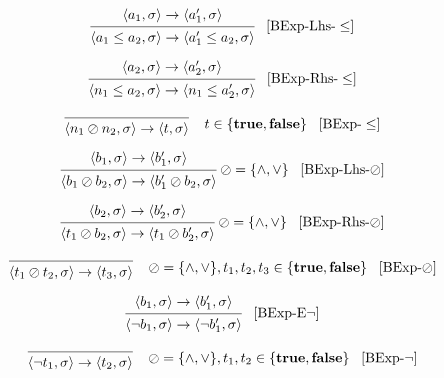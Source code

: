 \[
\begin{prooftree}
\hypo{
	\langle a_1, \sigma \rangle \rightarrow
	\langle a_1^\prime, \sigma \rangle 
} 
\infer1{
	\langle a_1 \leq a_2, \sigma \rangle \rightarrow  
	\langle a_1^\prime \leq a_2, \sigma \rangle
}
\end{prooftree} \; \; \; [\text{BExp-Lhs-}\leq]
\]

\[
\begin{prooftree}
\hypo{
	\langle a_2, \sigma \rangle \rightarrow
	\langle a_2^\prime, \sigma \rangle 
} 
\infer1{
	\langle n_1 \leq a_2, \sigma \rangle \rightarrow  
	\langle n_1 \leq a_2^\prime, \sigma \rangle
}
\end{prooftree} \; \; \; [\text{BExp-Rhs-}\leq]
\]

\[
\begin{prooftree}
\infer0{
	\langle n_1 \oslash n_2, \sigma \rangle \rightarrow  
	\langle t, \sigma \rangle
}
\end{prooftree} \; \; \; \; t \in \{ \textbf{true}, \textbf{false} \} \; \; \; [\text{BExp-}\leq]
\]

\[
\begin{prooftree}
\hypo{
	\langle b_1, \sigma \rangle \rightarrow
	\langle b_1^\prime, \sigma \rangle 
} 
\infer1{
	\langle b_1 \oslash b_2, \sigma \rangle \rightarrow  
	\langle b_1^\prime \oslash b_2, \sigma \rangle
}
\end{prooftree} \; \oslash = \{\land,\lor\} \; \; \; [\text{BExp-Lhs-}\oslash]
\]

\[
\begin{prooftree}
\hypo{
	\langle b_2, \sigma \rangle \rightarrow
	\langle b_2^\prime, \sigma \rangle 
} 
\infer1{
	\langle t_1 \oslash b_2, \sigma \rangle \rightarrow  
	\langle t_1 \oslash b_2^\prime, \sigma \rangle
}
\end{prooftree} \; \oslash = \{\land,\lor\} \; \; \; [\text{BExp-Rhs-}\oslash]
\]

\[
\begin{prooftree}
\infer0{
	\langle t_1 \oslash t_2, \sigma \rangle \rightarrow  
	\langle t_3,  \sigma \rangle
}
\end{prooftree} \; \; \; \; \oslash = \{\land,\lor\}, t_1, t_2, t_3 \in \{ \textbf{true}, \textbf{false} \}  \; \; \; [\text{BExp-}\oslash]
\]

\[
\begin{prooftree}
\hypo{
	\langle b_1, \sigma \rangle \rightarrow  
	\langle b_1^\prime,  \sigma \rangle
}
\infer1{
	\langle \neg b_1, \sigma \rangle \rightarrow  
	\langle \neg b_1^\prime,  \sigma \rangle
}
\end{prooftree} \; \; \; [\text{BExp-E}\neg]
\]

\[
\begin{prooftree}
\infer0{
	\langle \neg t_1, \sigma \rangle \rightarrow  
	\langle t_2,  \sigma \rangle
}
\end{prooftree} \; \; \; \; \oslash = \{\land,\lor\}, t_1, t_2 \in \{ \textbf{true}, \textbf{false} \}  \; \; \; [\text{BExp-}\neg]
\]


